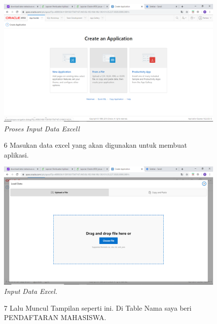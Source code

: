 \begin{enumerate}
\begin{figure}
    \begin{center}
\includegraphics[scale=0.2]{figures/5.png}
    \caption{\textit{{Proses Input Data Excel}l}}
        \end{center}
\label{gambar}
\end{figure}

\begin{figure}
\item[6] Masukan data excel yang akan digunakan untuk membuat aplikasi.

    \begin{center}
\includegraphics[scale=0.2]{figures/6.png}
    \caption{\textit{Input Data Excel.}}
        \end{center}
\label{gambar}
\end{figure}

\begin{figure}
\item[7] Lalu Muncul Tampilan seperti ini. Di Table Nama saya beri PENDAFTARAN MAHASISWA.


\end{figure}
\end{enumerate}
